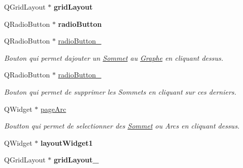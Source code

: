 \begin{DoxyCompactItemize}
Q\+Grid\+Layout $\ast$ {\bfseries grid\+Layout}
\item 
\mbox{\label{classUi__MainWindow_a8c0b08cef606b56c9a9e74a1bc0a0549}} 
Q\+Radio\+Button $\ast$ {\bfseries radio\+Button}
\item 
\mbox{\label{classUi__MainWindow_a7a1d70772b30095ec5efc962ba2f3f40}} 
Q\+Radio\+Button $\ast$ \hyperlink{classUi__MainWindow_a7a1d70772b30095ec5efc962ba2f3f40}{radio\+Button\+\_}
\begin{DoxyCompactList}\small\item\em Bouton qui permet d\textquotesingle{}ajouter un \hyperlink{classSommet}{Sommet} au \hyperlink{classGraphe}{Graphe} en cliquant dessus. \end{DoxyCompactList}\item 
\mbox{\label{classUi__MainWindow_a479864a3276ed79cf2332569a717a0f3}} 
Q\+Radio\+Button $\ast$ \hyperlink{classUi__MainWindow_a479864a3276ed79cf2332569a717a0f3}{radio\+Button\+\_}
\begin{DoxyCompactList}\small\item\em Bouton qui permet de supprimer les Sommets en cliquant sur ces derniers. \end{DoxyCompactList}\item 
\mbox{\label{classUi__MainWindow_aa8d0214d12e6245c02f62b98e804e4b7}} 
Q\+Widget $\ast$ \hyperlink{classUi__MainWindow_aa8d0214d12e6245c02f62b98e804e4b7}{page\+Arc}
\begin{DoxyCompactList}\small\item\em Boutton qui permet de selectionner des \hyperlink{classSommet}{Sommet} ou Arcs en cliquant dessus. \end{DoxyCompactList}\item 
\mbox{\label{classUi__MainWindow_a941d7a5b68bac6bd79f88e80cf138ac5}} 
Q\+Widget $\ast$ {\bfseries layout\+Widget1}
\item 
\mbox{\label{classUi__MainWindow_acbbc615e662a726cd71cabd62c7d2a70}} 
Q\+Grid\+Layout $\ast$ {\bfseries grid\+Layout\+\_}
\item 
\mbox{\label{classUi__MainWindow_ad2be6361714bb2cd94319f5e25b15baa}} 

\end{DoxyCompactItemize}
